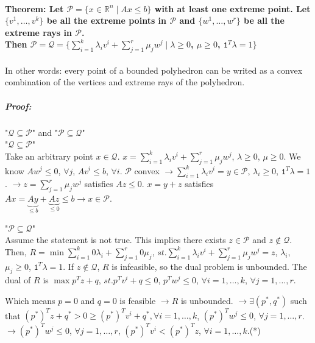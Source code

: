 \documentclass[main]{subfiles}
\begin{document}
\paragraph{Theorem: Let $\mathcal{P} = \{x \in \mathbb{R}^n \mid Ax \leq b\}$
with at least one extreme point. Let $\{v^1, \dots, v^k\}$ be all the extreme
points in $\mathcal{P}$ and $\{w^1, \dots, w^r\}$ be all the extreme rays in
$\mathcal{P}$. \\ Then $\mathcal{P} = \mathcal{Q} = \{ \sum_{i =1}^{k}
\lambda_i v^i + \sum_{j=1}^{r} \mu_j w^j \mid \lambda \geq 0$, $\mu \geq 0$,
$\mathtt{1}^T \lambda =1 \}$}
In other words: every point of a bounded polyhedron can be writed as a convex
combination of the vertices and extreme rays of the polyhedron.

\subparagraph{Proof:} "$\mathcal{Q} \subseteq \mathcal{P}$" and "$\mathcal{P} \subseteq \mathcal{Q}$"\\

"$\mathcal{Q} \subseteq \mathcal{P}$"\\
Take an arbitrary point $x \in \mathcal{Q}$. $x = \sum_{i =1}^{k} \lambda_i v^i
+ \sum_{j=1}^{r} \mu_j w^j$, $\lambda \geq 0$, $\mu \geq 0$. We know $A w^j
\leq 0$, $\forall j$, $Av^i \leq b$, $\forall i$.
$\mathcal{P}$ convex $\rightarrow \sum_{i=1}^{k} \lambda_i v^i = y \in
\mathcal{P}$, $\lambda_i \geq 0$, $\mathtt{1}^T \lambda = 1$.
$\rightarrow z = \sum_{j = 1}^{r} \mu_j w^j$ satisfies $Az \leq 0$. $x = y + z$
satisfies $Ax = \underbrace{Ay}_{\leq b} + \underbrace{Az}_{\leq 0} \leq b
\rightarrow x \in \mathcal{P}$.

"$\mathcal{P} \subseteq \mathcal{Q}$"\\
Assume the statement is not true. This implies there exists $z \in \mathcal{P}$
and $z \notin \mathcal{Q}$.
Then, $R = \min \sum_{i = 1}^{k} 0\lambda_i + \sum_{j=1}^{r} 0 \mu_j$, $st.
\sum_{i = 1}^{k} \lambda_i v^i + \sum_{j = 1}^{r} \mu_j w^j = z$, $\lambda_i$,
$\mu_j \geq 0$, $\mathtt{1}^T \lambda = 1$. If $z \notin \mathcal{Q}$, $R$ is
infeasible, so the dual problem is unbounded. The dual of $R$ is
$\max p^T z + q$, $st. p^T v^i + q \leq 0$, $p^T w^j \leq 0$, $\forall i =1,
\dots, k$, $\forall j = 1, \dots, r$.

Which means $p = 0$ and $q = 0$ is feasible $\rightarrow R$ is unbounded.
$\rightarrow \exists (p^*, q^*)$ such that $(p^*)^T z + q^* > 0 \geq (p^*)^T
v^i + q^*, \forall i = 1, \dots, k$, $(p^*)^T w^j \leq 0$, $\forall j = 1,
\dots, r$. \\

$\rightarrow (p^*)^T w^j \leq 0$, $\forall j = 1, \dots, r$, $(p^*)^T v^i <
(p^*)^T z$, $\forall i = 1, \dots, k$.(*)
\end{document}
